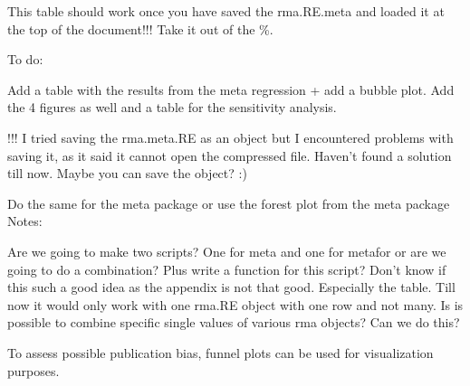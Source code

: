 \documentclass[11pt, a4paper]{article} %
\begin{document}
This table should work once you have saved the rma.RE.meta and loaded it at the top of the document!!! Take it out of the \%.


\begin{table}[ht]
\centering
\caption{Results of the meta-regression. Test for heterogeneity taking all four continents into account} 
{\footnotesize
{}
}
\end{table}
To do:

Add a table with the results from the meta regression + add a bubble plot. Add the 4 figures as well and a table for the sensitivity analysis. 

!!! I tried saving the rma.meta.RE as an object but I encountered problems with saving it, as it said it cannot open the compressed file. Haven't found a solution till now. Maybe you can save the object? :)

Do the same for the meta package or use the forest plot from the meta package\\

Notes:

Are we going to make two scripts? One for meta and one for metafor or are we going to do a combination? Plus write a function for this script? 
Don't know if this such a good idea as the appendix is not that good. Especially the table. Till now it would only work with one rma.RE object with one row and not many. Is is possible to combine specific single values of various rma objects? Can we do this?



To assess possible publication bias, funnel plots can be used for visualization purposes.
\end{document}

